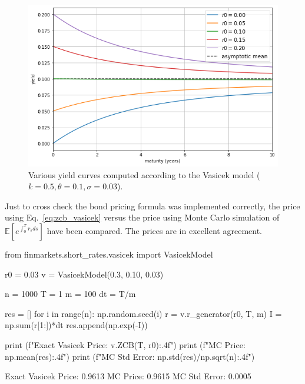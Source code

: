 \begin{figure}[htb]
    \centering
    \includegraphics[width=0.7\linewidth]{figures/vasicek_yields}
    \caption{Various yield curves computed according to the Vasicek model ($k=0.5, \theta=0.1, \sigma=0.03$).}
    \label{fig:yield_vasicek}
\end{figure}

Just to cross check the bond pricing formula was implemented correctly, the price using Eq.~\ref{eq:zcb_vasicek} versus the price using Monte Carlo simulation of $\mathbb{E}\left[e^{\int_0^T r_s ds}\right]$ have been compared. The prices are in excellent agreement.

\begin{ipython}
from finmarkets.short_rates.vasicek import VasicekModel
  
r0 = 0.03
v = VasicekModel(0.3, 0.10, 0.03)

n = 1000
T = 1
m = 100
dt = T/m

res = []
for i in range(n):
    np.random.seed(i)
    r = v.r_generator(r0, T, m)
    I = np.sum(r[1:])*dt
    res.append(np.exp(-I))

print (f"Exact Vasicek Price: {v.ZCB(T, r0):.4f}")
print (f"MC Price: {np.mean(res):.4f}")
print (f"MC Std Error: {np.std(res)/np.sqrt(n):.4f}")
\end{ipython}
\begin{ioutput}
Exact Vasicek Price: 0.9613
MC Price: 0.9615
MC Std Error: 0.0005
\end{ioutput}

